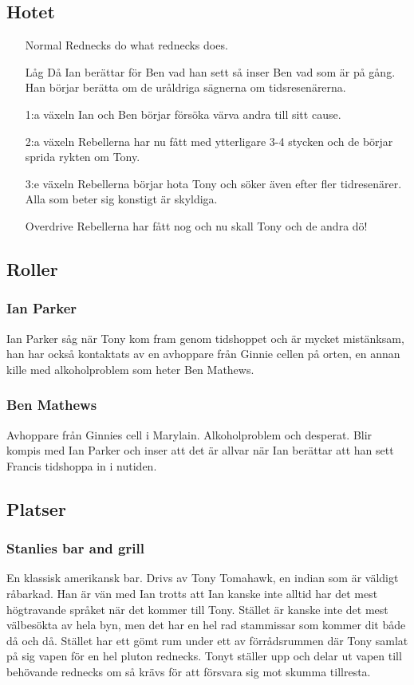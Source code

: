 \documentclass[a5paper,10pt]{report}
\begin{document}
\subsection{Hotet}
\begin{itemize}
  \item[Normal] Rednecks do what rednecks does.
  \item[Låg] Då Ian berättar för Ben vad han sett så inser Ben vad som är på gång. Han börjar berätta om de uråldriga sägnerna om tidsresenärerna.
  \item[1:a växeln] Ian och Ben börjar försöka värva andra till sitt cause.
  \item[2:a växeln] Rebellerna har nu fått med ytterligare 3-4 stycken och de börjar sprida rykten om Tony.
  \item[3:e växeln] Rebellerna börjar hota Tony och söker även efter fler tidresenärer. Alla som beter sig konstigt är skyldiga.
  \item[Overdrive] Rebellerna har fått nog och nu skall Tony och de andra dö!
\end{itemize}
\subsection{Roller}
\subsubsection{Ian Parker}
Ian Parker såg när Tony kom fram genom tidshoppet och är mycket mistänksam, han har också kontaktats av en avhoppare från Ginnie cellen på orten, en annan kille med alkoholproblem som heter Ben Mathews.
\subsubsection{Ben Mathews}
Avhoppare från Ginnies cell i Marylain. Alkoholproblem och desperat. Blir kompis med Ian Parker och inser att det är allvar när Ian berättar att han sett Francis tidshoppa in i nutiden.
\subsection{Platser}
\subsubsection{Stanlies bar and grill}
En klassisk amerikansk bar. Drivs av Tony Tomahawk, en indian som är väldigt råbarkad. Han är vän med Ian trotts att Ian kanske inte alltid har det mest högtravande språket när det kommer till Tony. Stället är kanske inte det mest välbesökta av hela byn, men det har en hel rad stammissar som kommer dit både då och då. Stället har ett gömt rum under ett av förrådsrummen där Tony samlat på sig vapen för en hel pluton rednecks. Tonyt ställer upp och delar ut vapen till behövande rednecks om så krävs för att försvara sig mot skumma tillresta.
\end{document}
